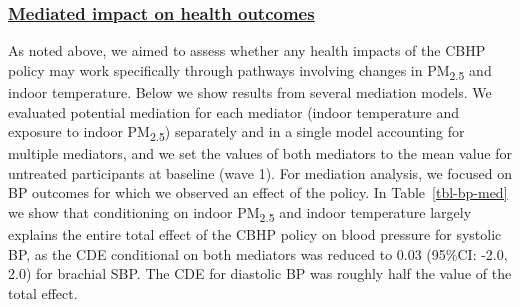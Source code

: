 \documentclass[
  letterpaper,
  DIV=11,
  numbers=noendperiod]{scrartcl}
\providecommand{\DIFadd}[1]{{\protect\color{blue}\underline{#1}}} %
\providecommand{\DIFaddbegin}{} %
\providecommand{\DIFaddend}{} %
\providecommand{\DIFdelbegin}{} %
\providecommand{\DIFdelend}{} %
\newcommand{\DIFscaledelfig}{0.5}
\newlength{\DIFdelgraphicswidth} %
\newlength{\DIFdelgraphicsheight} %
\newcommand{\DIFaddincludegraphics}[2][]{{\color{blue}\fbox{\DIFOincludegraphics[#1]{#2}}}} %
\newcommand{\DIFdelincludegraphics}[2][]{%
\sbox{\DIFdelgraphicsbox}{\DIFOincludegraphics[#1]{#2}}%
\settoboxwidth{\DIFdelgraphicswidth}{\DIFdelgraphicsbox} %
\settoboxtotalheight{\DIFdelgraphicsheight}{\DIFdelgraphicsbox} %
\scalebox{\DIFscaledelfig}{%
\parbox[b]{\DIFdelgraphicswidth}{\usebox{\DIFdelgraphicsbox}\\[-\baselineskip] \rule{\DIFdelgraphicswidth}{0em}}\llap{\resizebox{\DIFdelgraphicswidth}{\DIFdelgraphicsheight}{%
\setlength{\unitlength}{\DIFdelgraphicswidth}%
\begin{picture}(1,1)%
\thicklines\linethickness{2pt} %
{\color[rgb]{1,0,0}\put(0,0){\framebox(1,1){}}}%
{\color[rgb]{1,0,0}\put(0,0){\line( 1,1){1}}}%
{\color[rgb]{1,0,0}\put(0,1){\line(1,-1){1}}}%
\end{picture}%
}\hspace*{3pt}}} %
} %
\DeclareRobustCommand{\DIFaddbegin}{\DIFOaddbegin \let\includegraphics\DIFaddincludegraphics} %
\DeclareRobustCommand{\DIFaddend}{\DIFOaddend \let\includegraphics\DIFOincludegraphics} %
\DeclareRobustCommand{\DIFdelbegin}{\DIFOdelbegin \let\includegraphics\DIFdelincludegraphics} %
\DeclareRobustCommand{\DIFdelend}{\DIFOaddend \let\includegraphics\DIFOincludegraphics} %
\begin{document}
\DIFdelbegin %
\DIFdelend \DIFaddbegin \subsubsection{\DIFadd{Mediated impact on health
outcomes}}\label{mediated-impact-on-health-outcomes}
\DIFaddend 

As noted above, we aimed to assess whether any health impacts of the
CBHP policy may work specifically through pathways involving changes in
PM\textsubscript{2.5} and indoor temperature. Below we show results from
several mediation models. We evaluated potential mediation for each
mediator (indoor temperature and exposure to indoor
PM\textsubscript{2.5}) separately and in a single model accounting for
multiple mediators, and we set the values of both mediators to the mean
value for untreated participants at baseline (wave 1). For mediation
analysis, we focused on BP outcomes for which we observed an effect of
the policy. In Table~\ref{tbl-bp-med} we show that conditioning on
indoor PM\textsubscript{2.5} and indoor temperature largely explains the
entire total effect of the CBHP policy on blood pressure for systolic
BP, as the CDE conditional on both mediators was reduced to 0.03
(95\%CI: -2.0, 2.0) for brachial SBP. The CDE for diastolic BP was
roughly half the value of the total effect.
\end{document}
